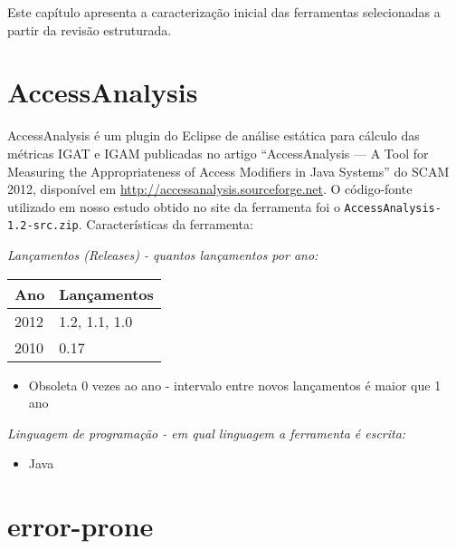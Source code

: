 {Este capítulo apresenta a caracterização inicial das ferramentas selecionadas a partir da revisão estruturada.}
\label{caracterizacao-ferramentas}

\section{AccessAnalysis}

AccessAnalysis é um plugin do Eclipse de análise estática 
para cálculo das métricas IGAT e IGAM
publicadas no artigo ``AccessAnalysis — A Tool for Measuring the
Appropriateness of Access Modifiers in Java Systems'' do SCAM 2012,
disponível em \url{http://accessanalysis.sourceforge.net}. O código-fonte
utilizado em nosso estudo obtido no site da ferramenta foi o
\texttt{AccessAnalysis-1.2-src.zip}. Características da ferramenta:

\begin{description}

  \item {\it Lançamentos ({\it Releases}) - quantos lançamentos por ano:}
    \begin{table}[h!]
      \centering
      \begin{tabular}{| l | l |}
        \hline
        Ano  & Lançamentos    \\
        \hline
        2012 & 1.2, 1.1, 1.0  \\
        2010 & 0.17           \\
        \hline
      \end{tabular}
    \end{table}
    \begin{itemize}
      \item Obsoleta 0 vezes ao ano - intervalo entre novos lançamentos é maior que 1 ano
    \end{itemize}

  \item {\it Linguagem de programação - em qual linguagem a ferramenta é escrita:}
    \begin{itemize}
      \item Java
    \end{itemize}

\end{description}

\section{error-prone}

